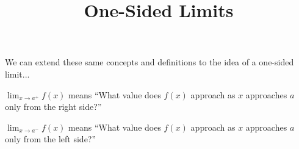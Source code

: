 \documentclass{ximera}
\title{One-Sided Limits}
\begin{document}
\begin{abstract}
\end{abstract}

\maketitle

We can extend these same concepts and definitions to the idea of a one-sided limit...

$\lim_{x \to a^+} f(x)$ means ``What value does $f(x)$ approach as $x$ approaches $a$ only from the right side?''

$\lim_{x \to a^-} f(x)$ means ``What value does $f(x)$ approach as $x$ approaches $a$ only from the left side?''
\end{document}
